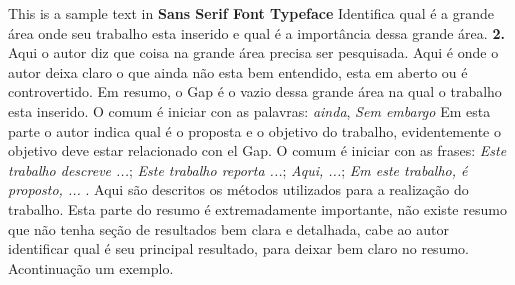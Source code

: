  

\setlength{\absparsep}{18pt} %
\begin{resumo}

{\sffamily This is a sample text in \textbf{Sans Serif Font Typeface}}
Identifica qual é a grande área onde seu trabalho esta inserido e qual é a importância dessa grande área.
\textbf{2. }
Aqui o autor diz que coisa na grande área precisa ser pesquisada. 
Aqui é onde o autor deixa claro o que ainda não esta bem entendido, esta em aberto ou é controvertido. 
Em resumo, o Gap é o vazio dessa grande área na qual  o trabalho esta inserido. 
O comum é iniciar con as palavras: \textit{ainda}, \textit{Sem embargo}
\textbf{}
Em esta parte o autor indica qual é o proposta e o objetivo do trabalho, evidentemente o objetivo deve estar relacionado con el Gap. O comum é iniciar con as frases: \textit{Este trabalho descreve ...}; \textit{Este trabalho reporta ...}; \textit{Aqui, ...}; \textit{Em este trabalho, é proposto, ... }.
\textbf{}
Aqui são descritos os métodos utilizados para a realização do trabalho.
\textbf{}
Esta parte do resumo é extremadamente importante, não existe resumo que não tenha seção de resultados bem clara e detalhada, cabe ao autor identificar qual é seu principal resultado, para deixar bem claro no resumo.  Acontinuação um exemplo.


\end{resumo}
